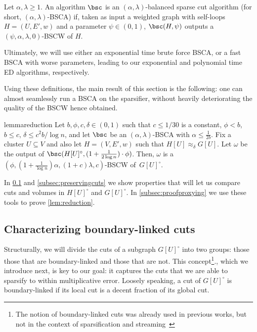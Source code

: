 \begin{definition}
	\label{def:bsca}
	Let $\alpha,\lambda \ge 1$. An algorithm $\bsc$ is an $(\alpha, \lambda)$-balanced sparse cut algorithm (for short, $(\alpha,\lambda)$-BSCA) if, taken as input a weighted graph with self-loops $H=(U,E',w)$ and a parameter $\psi \in (0,1)$, $\bsc(H,\psi)$ outputs a $(\psi,\alpha,\lambda,0)$-BSCW of $H$.
\end{definition}
\noindent
Ultimately, we will use either an exponential time brute force BSCA, or a fast BSCA with worse parameters, leading to our exponential and polynomial time ED algorithms, respectively.

Using these definitions, the main result of this section is the following: one can almost seamlessly run a BSCA on the sparsifier, without heavily deteriorating the quality of the BSCW hence obtained.
\begin{restatable}{lemma}{reduction}
	\label{lem:reduction}
	Let $b, \phi, c,\delta \in (0,1)$ such that $c \leq 1/30$ is a constant, $\phi < b$, $b \le c$, $\delta \le c^2b/ \log n$, and  let $\bsc$ be an $(\alpha,\lambda)$-BSCA with $ \alpha \le \frac{1}{2b}$. Fix a cluster $U \subseteq V$ and also let $H=(V,E',w)$ such that $H[U] \approx_\delta G[U]$. Let $\omega$ be the output of $\bsc(H[U]^\circ, (1+\frac{1}{2\log n}) \cdot \phi)$. Then, $\omega$ is a  $(\phi,(1+\frac{1}{\log n})\alpha,(1+c)\lambda,c)$-BSCW of~$G[U]^\circ$.
\end{restatable}
\noindent
In \cref{subsec:boundlink} and \cref{subsec:preservingcuts}  we show properties that will let us compare cuts and volumes in $H[U]^\circ$ and $G[U]^\circ$. In \cref{subsec:proofproxying} we use these tools to prove \cref{lem:reduction}.

\subsection{Characterizing boundary-linked cuts}
\label{subsec:boundlink}
Structurally, we will divide the cuts of a subgraph $G[U]^\circ$ into two groups: those those that are boundary-linked and those that are not. This concept\footnote{The notion of boundary-linked cuts was already used in previous works, but not in the context of sparsification and streaming~\cite{boundlink,mincutjli}}., which we introduce next, is key to our goal: it captures the cuts that we are able to sparsify to within multiplicative error. Loosely speaking, a cut of $G[U]^\circ$ is boundary-linked if its local cut is a decent fraction of its global cut.

